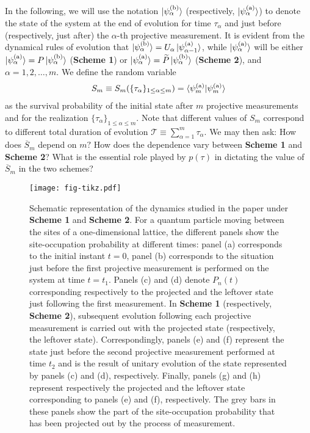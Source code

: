 \documentclass[12pt]{iopart}
\def\ket#1{\mathinner{|{#1}\rangle}}
\begin{document}
In the following, we will use the notation $\ket{\psi_\alpha^{({\rm b})}}$ (respectively,  $\ket{\psi_\alpha^{({\rm a})}}$) to
denote the state of the system at the end of evolution for time
$\tau_\alpha$
and just before (respectively, just after) the $\alpha$-th projective measurement.  It
is evident from the dynamical rules of evolution that
$\ket{\psi_\alpha^{({\rm b})}}=U_\alpha\ket{\psi_{\alpha-1}^{({\rm a})}}$, while
$\ket{\psi_\alpha^{({\rm a})}}$ will be
either $\ket{\psi_\alpha^{({\rm a})}}=P\ket{\psi_\alpha^{({\rm b})}}$
(\textbf{Scheme 1}) or
$\ket{\psi_\alpha^{({\rm a})}}=\widetilde{P}\ket{\psi_\alpha^{({\rm b})}}$ (\textbf{Scheme 2}), and $\alpha=1,2,\ldots,m$.  We define the random variable
\begin{align}
        S_m \equiv S_m(\{\tau_\alpha\}_{1\le \alpha \le m})=\langle \psi_m^{({\rm
        a})}|\psi_m^{({\rm a})}\rangle
        \label{eq:qua-Sm-definition}
\end{align}
as the survival probability of the initial
state after $m$ projective measurements and for the realization
$\{\tau_\alpha\}_{1\le \alpha \le m}$. Note that different values of
$S_m$ correspond to different total duration of evolution $
{\mathcal T}\equiv\sum_{\alpha=1}^m \tau_\alpha$. We may then ask: How does $\overline{S}_m$ depend on $m?$ How does the dependence vary between  \textbf{Scheme 1} and \textbf{Scheme 2}? What is the essential role
played by $p(\tau)$ in dictating the value
of $\overline{S}_m$ in the two schemes? 

\begin{figure}
\centering
\texttt{[image: fig-tikz.pdf]}
\caption{Schematic representation of the dynamics studied in the paper under {\bf Scheme 1} and {\bf Scheme 2}.  For a quantum particle moving between the sites of a one-dimensional lattice,  the different panels show the site-occupation probability at different times: panel (a) corresponds to the initial instant $t=0$, panel (b) corresponds to the situation just before the first projective measurement is performed on the system at time $t=t_1$. Panels (c) and (d) denote $P_n(t)$ corresponding respectively to the projected and the leftover state just following the first measurement.  In {\bf Scheme 1} (respectively, {\bf Scheme 2}), subsequent evolution following each projective measurement is carried out with the projected state (respectively, the leftover state). Correspondingly, panels (e) and (f) represent the state just before the second projective measurement performed at time $t_2$ and is the result of unitary evolution of the state represented by panels (c) and (d), respectively.  Finally, panels (g) and (h) represent respectively the projected and the leftover state corresponding to panels (e) and (f), respectively.  The grey bars in these panels show the part of the site-occupation probability that has been projected out by the process of measurement. }
\label{fig:dynamics-schematic}
\end{figure}  
\end{document}
